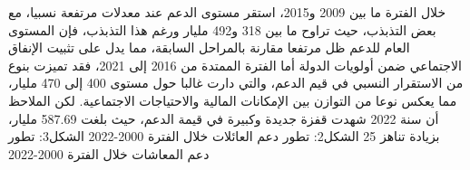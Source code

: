 \documentclass[12pt,a4paper]{report}
\begin{document}
خلال الفترة ما بين 2009 و2015، استقر مستوى الدعم عند معدلات مرتفعة نسبيا، مع بعض التذبذب، حيث تراوح ما بين 318 و492 مليار ورغم هذا التذبذب، فإن المستوى العام للدعم ظل مرتفعا مقارنة بالمراحل السابقة، مما يدل على تثبيت الإنفاق الاجتماعي ضمن أولويات الدولة أما الفترة الممتدة من 2016 إلى 2021، فقد تميزت بنوع من الاستقرار النسبي في قيم الدعم، والتي دارت غالبا حول مستوى 400 إلى 470 مليار، مما يعكس نوعا من التوازن بين الإمكانات المالية والاحتياجات الاجتماعية.
لكن الملاحظ أن سنة 2022 شهدت قفزة جديدة وكبيرة في قيمة الدعم، حيث بلغت 587.69 مليار، بزيادة تناهز 25%
الشكل2: تطور دعم العائلات خلال الفترة 2000-2022
الشكل3: تطور دعم المعاشات خلال الفترة 2000-2022
\end{document}
